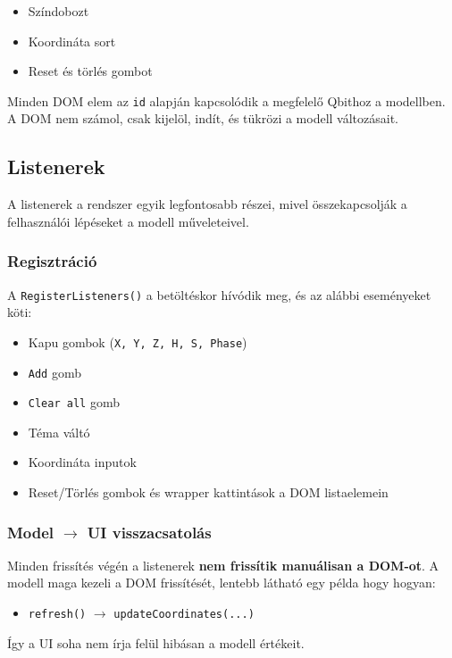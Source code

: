 \documentclass[12pt]{article}
\begin{document}
	\begin{itemize}
		\item Színdobozt
		\item Koordináta sort
		\item Reset és törlés gombot
	\end{itemize}
	
	\noindent Minden DOM elem az \texttt{id} alapján kapcsolódik a megfelelő Qbithoz a modellben. A DOM nem számol, csak kijelöl, indít, és tükrözi a modell változásait.
	
	\subsection{Listenerek}
	A listenerek a rendszer egyik legfontosabb részei, mivel összekapcsolják a felhasználói lépéseket a modell műveleteivel.
	
	\subsubsection{Regisztráció}
	A \texttt{RegisterListeners()} a betöltéskor hívódik meg, és az alábbi eseményeket köti:
	
	\begin{itemize}
		\item Kapu gombok (\texttt{X, Y, Z, H, S, Phase})
		\item \texttt{Add} gomb
		\item \texttt{Clear all} gomb
		\item Téma váltó
		\item Koordináta inputok
		\item Reset/Törlés gombok és wrapper kattintások a DOM listaelemein
	\end{itemize}
	
	\subsubsection{Model $\rightarrow$ UI visszacsatolás}
	Minden frissítés végén a listenerek \textbf{nem frissítik manuálisan a DOM-ot}.  
	A modell maga kezeli a DOM frissítését, lentebb látható egy példa hogy hogyan:
	
	\begin{itemize}
		\item \texttt{refresh()} $\rightarrow$ \texttt{updateCoordinates(...)}
	\end{itemize}
	
	\noindent Így a UI soha nem írja felül hibásan a modell értékeit.
	
\end{document}
